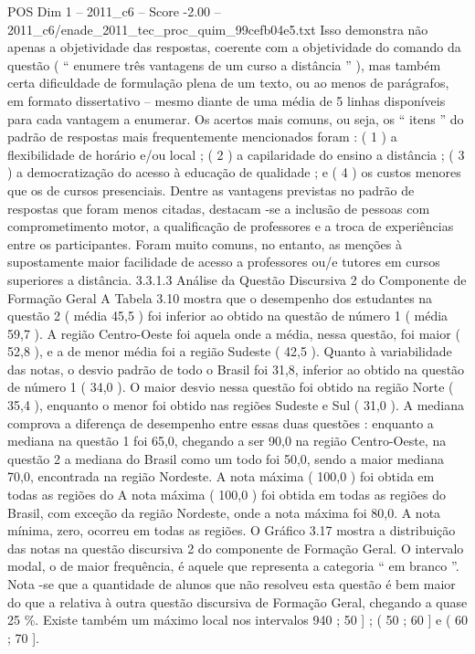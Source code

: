 \begin{textsample}{POS Dim 1 – 2011\_c6 – Score -2.00 – 2011\_c6/enade\_2011\_tec\_proc\_quim\_99cefb04e5.txt}
Isso demonstra não apenas a objetividade das respostas, coerente com a objetividade do comando da questão ( “ enumere três vantagens de um curso a distância ” ), mas também certa dificuldade de formulação plena de um texto, ou ao menos de parágrafos, em formato dissertativo – mesmo diante de uma média de 5 linhas disponíveis para cada vantagem a enumerar.
Os acertos mais comuns, ou seja, os “ itens ” do padrão de respostas mais frequentemente mencionados foram : ( 1 ) a flexibilidade de horário e/ou local ; ( 2 ) a capilaridade do ensino a distância ; ( 3 ) a democratização do acesso à educação de qualidade ; e ( 4 ) os custos menores que os de cursos presenciais.
Dentre as vantagens previstas no padrão de respostas que foram menos citadas, destacam -se a inclusão de pessoas com comprometimento motor, a qualificação de professores e a troca de experiências entre os participantes.
Foram muito comuns, no entanto, as menções à supostamente maior facilidade de acesso a professores ou/e tutores em cursos superiores a distância. 3.3.1.3 Análise da Questão Discursiva 2 do Componente de Formação Geral A Tabela 3.10 mostra que o desempenho dos estudantes na questão 2 ( média 45,5 ) foi inferior ao obtido na questão de número 1 ( média 59,7 ).
A região Centro-Oeste foi aquela onde a média, nessa questão, foi maior ( 52,8 ), e a de menor média foi a região Sudeste ( 42,5 ).
Quanto à variabilidade das notas, o desvio padrão de todo o Brasil foi 31,8, inferior ao obtido na questão de número 1 ( 34,0 ).
O maior desvio nessa questão foi obtido na região Norte ( 35,4 ), enquanto o menor foi obtido nas regiões Sudeste e Sul ( 31,0 ).
A mediana comprova a diferença de desempenho entre essas duas questões : enquanto a mediana na questão 1 foi 65,0, chegando a ser 90,0 na região Centro-Oeste, na questão 2 a mediana do Brasil como um todo foi 50,0, sendo a maior mediana 70,0, encontrada na região Nordeste.
A nota máxima ( 100,0 ) foi obtida em todas as regiões do A nota máxima ( 100,0 ) foi obtida em todas as regiões do Brasil, com exceção da região Nordeste, onde a nota máxima foi 80,0.
A nota mínima, zero, ocorreu em todas as regiões.
O Gráfico 3.17 mostra a distribuição das notas na questão discursiva 2 do componente de Formação Geral.
O intervalo modal, o de maior frequência, é aquele que representa a categoria “ em branco ”.
Nota -se que a quantidade de alunos que não resolveu esta questão é bem maior do que a relativa à outra questão discursiva de Formação Geral, chegando a quase 25 \%.
Existe também um máximo local nos intervalos 940 ; 50 ] ; ( 50 ; 60 ] e ( 60 ; 70 ].

\end{textsample}

